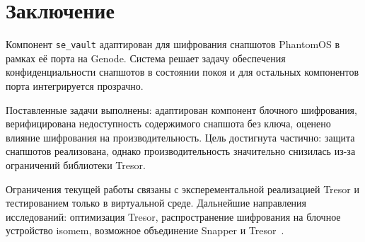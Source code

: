 \chapter{Заключение}

Компонент \texttt{se\_vault} адаптирован для шифрования снапшотов PhantomOS в рамках её порта на Genode. Система решает задачу обеспечения конфиденциальности снапшотов в состоянии покоя и для остальных компонентов порта интегрируется прозрачно.

Поставленные задачи выполнены: адаптирован компонент блочного шифрования, верифицирована недоступность содержимого снапшота без ключа, оценено влияние шифрования на производительность. Цель достигнута частично: защита снапшотов реализована, однако производительность значительно снизилась из-за ограничений библиотеки Tresor.

Ограничения текущей работы связаны с эксперементальной реализацией Tresor и тестированием только в виртуальной среде. Дальнейшие направления исследований: оптимизация Tresor, распространение шифрования на блочное устройство isomem, возможное объединение Snapper и Tresor~\cite{FOSDEM_Snapper_paper}.
